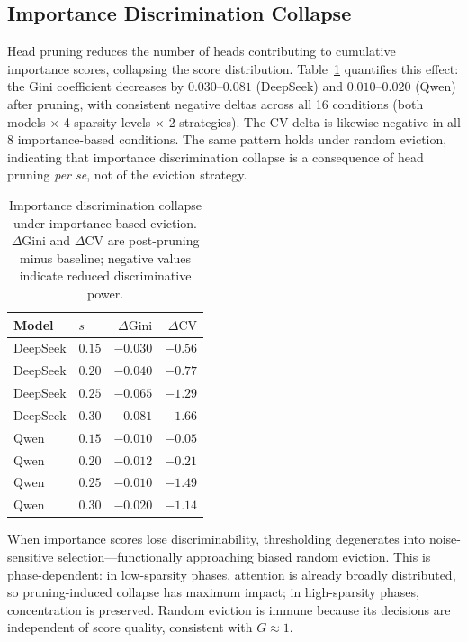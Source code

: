 \subsection{Importance Discrimination Collapse}
\label{sec:discrimination-collapse}

Head pruning reduces the number of heads contributing to cumulative importance scores, collapsing the score distribution. Table~\ref{tab:discrimination-metrics-full} quantifies this effect: the Gini coefficient decreases by $0.030$--$0.081$ (DeepSeek) and $0.010$--$0.020$ (Qwen) after pruning, with consistent negative deltas across all 16 conditions (both models $\times$ 4 sparsity levels $\times$ 2 strategies). The CV delta is likewise negative in all 8 importance-based conditions. The same pattern holds under random eviction, indicating that importance discrimination collapse is a consequence of head pruning \emph{per se}, not of the eviction strategy.

\begin{table}[t]
\centering
\caption{Importance discrimination collapse under importance-based eviction. $\Delta\mathrm{Gini}$ and $\Delta\mathrm{CV}$ are post-pruning minus baseline; negative values indicate reduced discriminative power.}
\label{tab:discrimination-metrics-full}
\small
\begin{tabular}{llrr}
\toprule
Model & $s$ & $\Delta\mathrm{Gini}$ & $\Delta\mathrm{CV}$ \\
\midrule
DeepSeek & $0.15$ & $-0.030$ & $-0.56$ \\
DeepSeek & $0.20$ & $-0.040$ & $-0.77$ \\
DeepSeek & $0.25$ & $-0.065$ & $-1.29$ \\
DeepSeek & $0.30$ & $-0.081$ & $-1.66$ \\
\midrule
Qwen & $0.15$ & $-0.010$ & $-0.05$ \\
Qwen & $0.20$ & $-0.012$ & $-0.21$ \\
Qwen & $0.25$ & $-0.010$ & $-1.49$ \\
Qwen & $0.30$ & $-0.020$ & $-1.14$ \\
\bottomrule
\end{tabular}
\end{table}

When importance scores lose discriminability, thresholding degenerates into noise-sensitive selection---functionally approaching biased random eviction. This is phase-dependent: in low-sparsity phases, attention is already broadly distributed, so pruning-induced collapse has maximum impact; in high-sparsity phases, concentration is preserved. Random eviction is immune because its decisions are independent of score quality, consistent with $G \approx 1$.

